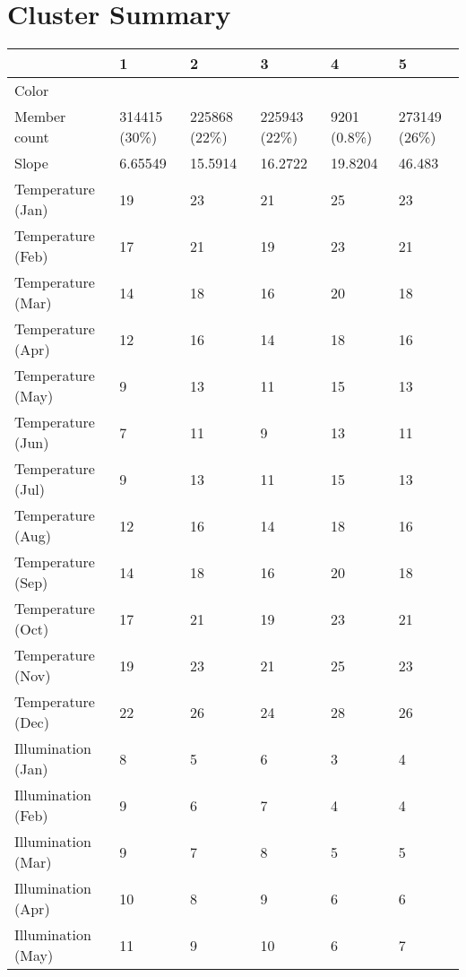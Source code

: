 \chapter{Cluster Summary} \label{AppendixA}

\begin{table}[]
  \centering
	    \begin{tabular}{|p{5cm}|p{2cm}|p{2cm}|p{2cm}|p{2cm}|p{2cm}|}
		\hline	
  	     & \textbf{1} &  \textbf{2} & \textbf{3} & \textbf{4} & \textbf{5} \\
		\hline
  	    Color & \cellcolor{cluster_1} & \cellcolor{cluster_2} & \cellcolor{cluster_3} & \cellcolor{cluster_4} & \cellcolor{cluster_5} \\
		\hline
  	    Member count & 314415 (30\%)  & 225868 (22\%) & 225943 (22\%)  & 9201 (0.8\%) & 273149 (26\%) \\
		\hline
  	    Slope & 6.65549 & 15.5914 & 16.2722 & 19.8204 & 46.483 \\
		\hline
  	    Temperature (Jan) & 19 & 23 & 21 & 25 & 23 \\
		\hline
  	    Temperature (Feb) & 17 & 21 & 19 & 23 & 21 \\
		\hline
  	    Temperature (Mar) & 14 & 18 & 16 & 20 & 18 \\
		\hline
  	    Temperature (Apr) & 12 & 16 & 14 & 18 & 16 \\
		\hline
  	    Temperature (May) & 9 & 13 & 11 & 15 & 13 \\
		\hline
		Temperature (Jun) & 7 & 11 & 9 & 13 & 11 \\
		\hline
		Temperature (Jul) & 9 & 13 & 11 & 15 & 13 \\
		\hline
		Temperature (Aug) & 12 & 16 & 14 & 18 & 16 \\
		\hline
		Temperature (Sep) & 14 & 18 & 16 & 20 & 18 \\
		\hline
		Temperature (Oct) & 17 & 21 & 19 & 23 & 21 \\
		\hline
		Temperature (Nov) & 19 & 23 & 21 & 25 & 23 \\
		\hline
		Temperature (Dec) & 22 & 26 & 24 & 28 & 26 \\
		\hline
  	    Illumination (Jan) & 8 & 5 & 6 & 3 & 4 \\
		\hline
  	    Illumination (Feb) & 9 & 6 & 7 & 4 & 4 \\
		\hline
  	    Illumination (Mar) & 9 & 7 & 8 & 5 & 5 \\
		\hline
  	    Illumination (Apr) & 10 & 8 & 9 & 6 & 6 \\
		\hline
  	    Illumination (May) & 11 & 9 & 10 & 6 & 7 \\

\end{tabular}
\end{table}
